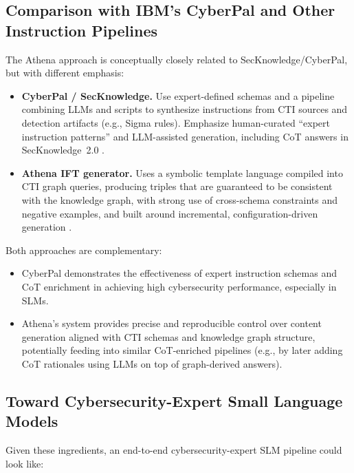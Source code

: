 \documentclass[unnumsec,webpdf,contemporary,large]{oup-authoring-template}
\theoremstyle{thmstyleone}
\theoremstyle{thmstyletwo}
\theoremstyle{thmstylethree}
\begin{document}
\subsection{Comparison with IBM's CyberPal and Other Instruction Pipelines}

The Athena approach is conceptually closely related to SecKnowledge/CyberPal, but with different emphasis:

\begin{itemize}
  \item \textbf{CyberPal / SecKnowledge.} Use expert-defined schemas and a pipeline combining LLMs and scripts to synthesize instructions from CTI sources and detection artifacts (e.g., Sigma rules). Emphasize human-curated ``expert instruction patterns'' and LLM-assisted generation, including CoT answers in SecKnowledge~2.0 \cite{levi2024cyberpal,levi2025toward}.
  \item \textbf{Athena IFT generator.} Uses a symbolic template language compiled into CTI graph queries, producing triples that are guaranteed to be consistent with the knowledge graph, with strong use of cross-schema constraints and negative examples, and built around incremental, configuration-driven generation \cite{cardei2025ift}.
\end{itemize}

Both approaches are complementary:

\begin{itemize}
  \item CyberPal demonstrates the effectiveness of expert instruction schemas and CoT enrichment in achieving high cybersecurity performance, especially in SLMs.
  \item Athena's system provides precise and reproducible control over content generation aligned with CTI schemas and knowledge graph structure, potentially feeding into similar CoT-enriched pipelines (e.g., by later adding CoT rationales using LLMs on top of graph-derived answers).
\end{itemize}

\subsection{Toward Cybersecurity-Expert Small Language Models}

Given these ingredients, an end-to-end cybersecurity-expert SLM pipeline could look like:
\end{document}
